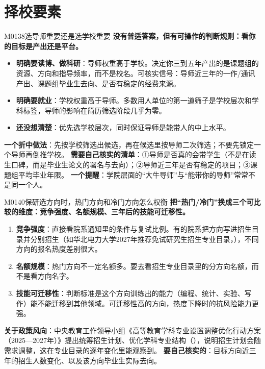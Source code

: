 \section{择校要素}
\begin{qa}{M0138}{选导师重要还是选学校重要}
\textbf{没有普适答案，但有可操作的判断规则：看你的目标是产出还是平台。}
\begin{itemize}
  \item \textbf{明确要读博、做科研}：导师权重高于学校。决定你三到五年产出的是课题组的资源、方向和指导频率，而不是校名。可核实信号：导师近三年的一作/通讯产出、课题组毕业生去向、是否有稳定的经费来源。
  \item \textbf{明确要就业}：学校权重高于导师。多数用人单位的第一道筛子是学校层次和学科标签，导师的影响在简历筛选阶段几乎为零。
  \item \textbf{还没想清楚}：优先选学校层次，同时保证导师是能带人的中上水平。
\end{itemize}
\textbf{一个折中做法}：先按学校筛选出候选，再在候选里按导师二次筛选；不要先锁定一个导师再倒推学校。
\textbf{需要自己核实的清单}：①导师是否真的会带学生（不是在读生口碑，而是毕业生论文的署名与去向）；②导师近三年是否有稳定的项目；③课题组平均毕业年限。
\textbf{一个提醒}：学院层面的“大牛导师”与“能带你的导师”常常不是同一个人。
\end{qa}

\begin{qa}{M0140}{保研选方向时，热门方向和冷门方向怎么权衡}
\textbf{把“热门/冷门”换成三个可比较的维度：竞争强度、名额规模、三年后的技能可迁移性。}
\begin{enumerate}
  \item \textbf{竞争强度}：直接看院系通知里的条件与复试比例。有的院系把方向写进招生目录并分别招生（如华北电力大学2027年推荐免试研究生招生专业目录，），不同方向的报名热度差别很大。
  \item \textbf{名额规模}：热门方向不一定名额多。要去看招生专业目录里的分方向名额，而不是看方向名字。
  \item \textbf{技能可迁移性}：判断标准是这个方向训练出的能力（编程、统计、实验、写作）能不能迁移到其他领域。可迁移性高的方向，热度下降时的抗风险能力更强。
\end{enumerate}
\textbf{关于政策风向}：中央教育工作领导小组《高等教育学科专业设置调整优化行动方案（2025—2027年）》提出统筹招生计划、优化学科专业结构（），说明招生计划会随需求调整，这在专业目录的逐年变化里能观察到。
\textbf{要自己核实的}：目标方向近三年的招生人数变化、以及该方向毕业生实际去向。
\end{qa}

